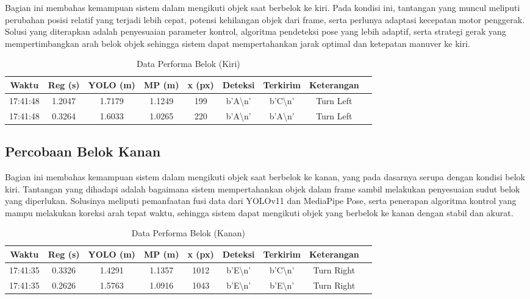 Bagian ini membahas kemampuan sistem dalam mengikuti objek saat berbelok ke kiri. Pada kondisi ini, tantangan yang muncul meliputi perubahan posisi relatif yang terjadi lebih cepat, potensi kehilangan objek dari frame, serta perlunya adaptasi kecepatan motor penggerak. Solusi yang diterapkan adalah penyesuaian parameter kontrol, algoritma pendeteksi pose yang lebih adaptif, serta strategi gerak yang mempertimbangkan arah belok objek sehingga sistem dapat mempertahankan jarak optimal dan ketepatan manuver ke kiri.

\begin{table}[H]
    \centering
    \caption{Data Performa Belok (Kiri)}
    \label{tab:performa_belok_kiri}
    \begin{tabular}{|c|c|c|c|c|c|c|c|c|}
    \hline
    Waktu & Reg (s) & YOLO (m) & MP (m) & x (px) & Deteksi & Terkirim & Keterangan \\ \hline
    17:41:48 & 1.2047 & 1.7179 & 1.1249 & 199 & b'A\textbackslash n' & b'C\textbackslash n' & Turn Left \\ \hline
    17:41:48 & 0.3264 & 1.6033 & 1.0265 & 220 & b'A\textbackslash n' & b'A\textbackslash n' & Turn Left \\ \hline
    \end{tabular}
\end{table}

\subsection{Percobaan Belok Kanan}
\label{subsec:percobaanbelokkanan}

Bagian ini membahas kemampuan sistem dalam mengikuti objek saat berbelok ke kanan, yang pada dasarnya serupa dengan kondisi belok kiri. Tantangan yang dihadapi adalah bagaimana sistem mempertahankan objek dalam frame sambil melakukan penyesuaian sudut belok yang diperlukan. Solusinya meliputi pemanfaatan fusi data dari YOLOv11 dan MediaPipe Pose, serta penerapan algoritma kontrol yang mampu melakukan koreksi arah tepat waktu, sehingga sistem dapat mengikuti objek yang berbelok ke kanan dengan stabil dan akurat.

\begin{table}[H]
    \centering
    \caption{Data Performa Belok (Kanan)}
    \label{tab:performa_belok_kanan}
    \begin{tabular}{|c|c|c|c|c|c|c|c|c|}
    \hline
    Waktu & Reg (s) & YOLO (m) & MP (m) & x (px) & Deteksi & Terkirim & Keterangan \\ \hline
    17:41:35 & 0.3326 & 1.4291 & 1.1357 & 1012 & b'E\textbackslash n' & b'C\textbackslash n' & Turn Right \\ \hline
    17:41:35 & 0.2626 & 1.5763 & 1.0916 & 1043 & b'E\textbackslash n' & b'E\textbackslash n' & Turn Right \\ \hline
    \end{tabular}
\end{table}

